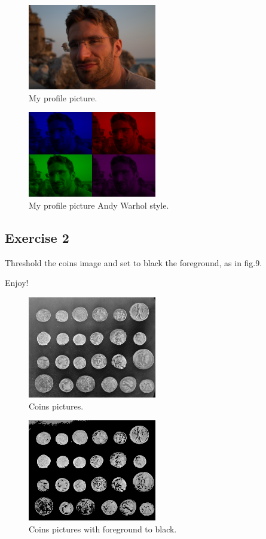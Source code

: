 \documentclass[aps,letterpaper,10pt]{revtex4}
\begin{document}
\begin{figure}[h]
\includegraphics[width=0.5\textwidth]{img/profile.jpg}
\centering
\caption{My profile picture.}\label{fig:6}
\end{figure}
\begin{figure}[h]
\includegraphics[width=0.5\textwidth]{img/new_profile.jpg}
\centering
\caption{My profile picture Andy Warhol style.}\label{fig:7}
\end{figure}

\subsection{Exercise 2}
Threshold the coins image and set to black the foreground, as in fig.9.

Enjoy!

\begin{figure}[h]
\includegraphics[width=0.5\textwidth]{img/coins.jpg}
\centering
\caption{Coins pictures.}\label{fig:8}
\end{figure}

\begin{figure}[h]
\includegraphics[width=0.5\textwidth]{img/new_coins.jpg}
\centering
\caption{Coins pictures with foreground to black.}\label{fig:9}
\end{figure}
\end{document}
